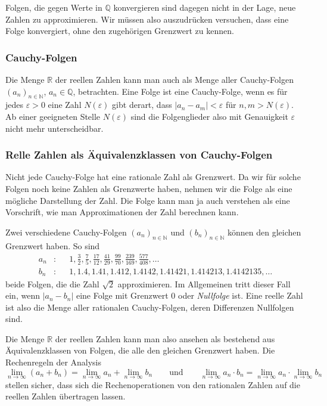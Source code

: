 Folgen, die gegen Werte in $\mathbb{Q}$ konvergieren sind dagegen
nicht in der Lage, neue Zahlen zu approximieren.
Wir müssen also auszudrücken versuchen, dass eine Folge konvergiert,
ohne den zugehörigen Grenzwert zu kennen.

\subsubsection{Cauchy-Folgen}
Die Menge $\mathbb{R}$ der reellen Zahlen kann man auch als Menge
aller Cauchy-Folgen $(a_n)_{n\in\mathbb{N}}$, $a_n\in\mathbb{Q}$,
betrachten.
%
Eine Folge ist eine Cauchy-Folge, wenn es für jedes $\varepsilon>0$
eine Zahl $N(\varepsilon)$ gibt derart, dass $|a_n-a_m|<\varepsilon$
für $n,m>N(\varepsilon)$.
Ab einer geeigneten Stelle $N(\varepsilon)$ sind die Folgenglieder also
mit Genauigkeit $\varepsilon$ nicht mehr unterscheidbar.


\subsubsection{Relle Zahlen als Äquivalenzklassen von Cauchy-Folgen}
Nicht jede Cauchy-Folge hat eine rationale Zahl als Grenzwert.
Da wir für solche Folgen noch keine Zahlen als Grenzwerte haben,
nehmen wir die Folge als eine mögliche Darstellung der Zahl.
Die Folge kann man ja auch verstehen als eine Vorschrift, wie man
Approximationen der Zahl berechnen kann.

Zwei verschiedene Cauchy-Folgen $(a_n)_{n\in\mathbb{N}}$ und
$(b_n)_{n\in\mathbb{N}}$ 
können den gleichen Grenzwert haben.
So sind 
\[
\begin{aligned}
a_n&\colon&&
1,\frac32,\frac75,\frac{17}{12},\frac{41}{29},\frac{99}{70},\frac{239}{169},
\frac{577}{408},\dots
\\
b_n&\colon&&
1,1.4,1.41,1.412,1.4142,1.41421,1.414213,1.4142135,\dots
\end{aligned}
\]
beide Folgen, die die Zahl $\sqrt{2}$ approximieren.
Im Allgemeinen tritt dieser Fall ein, wenn $|a_n-b_n|$ eine
Folge mit Grenzwert $0$ oder {\em Nullfolge} ist.
%
Eine reelle Zahl ist also die Menge aller rationalen Cauchy-Folgen,
deren Differenzen Nullfolgen sind.

Die Menge $\mathbb{R}$ der reellen Zahlen kann man also ansehen
als bestehend aus Äquivalenzklassen von Folgen, die alle den gleichen
Grenzwert haben.
Die Rechenregeln der Analysis 
\[
\lim_{n\to\infty} (a_n + b_n)
=
\lim_{n\to\infty} a_n +
\lim_{n\to\infty} b_n
\qquad\text{und}\qquad
\lim_{n\to\infty} a_n \cdot b_n
=
\lim_{n\to\infty} a_n \cdot
\lim_{n\to\infty} b_n 
\]
stellen sicher, dass sich die Rechenoperationen von den rationalen
Zahlen auf die reellen Zahlen übertragen lassen.





